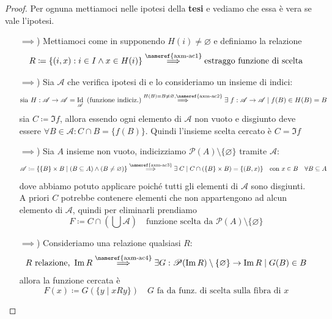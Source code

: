 \documentclass[a4paper,10pt]{article}
\theoremstyle{definition}
\DeclareMathOperator*{\Id}{Id}
\theoremstyle{indentdefinition}
\theoremstyle{indentpostulate}
\theoremstyle{indenttheorem}
\theoremstyle{myremark}
\theoremstyle{indentgeneral}
\begin{document}
\begin{proof} Per ognuna mettiamoci nelle ipotesi della \textbf{tesi} e vediamo che essa è vera se vale l'ipotesi.
    \begin{itemize}
        \item[\nameref{axm-ac1}$\implies$\nameref{axm-ac2})] Mettiamoci come in  supponendo $H(i)\ne\varnothing$ e definiamo la relazione
        $$R\coloneqq\{(i,x):i\in I\land x\in H(i)\}\overset{\text{\nameref{axm-ac1}}}{\implies}\text{estraggo funzione di scelta}$$
        
        \item[\nameref{axm-ac2}$\implies$\nameref{axm-ac3})] Sia $\mathscr{A}$ che verifica ipotesi di  e lo consideriamo un insieme di indici:
        $$\text{sia } H:\mathscr{A}\to \mathscr{A}=\Id_\mathscr{A} \text{ (funzione indiciz.)}\overset{H(B)=B\ne\varnothing,\text{\nameref{axm-ac2}}}{\implies}\exists \; f:\mathscr{A}\to \mathscr{A}\mid f(B)\in H(B)=B$$
        sia $C\coloneqq\Im f$, allora essendo ogni elemento di $\mathscr{A}$ non vuoto e disgiunto deve essere $\forall B\in\mathscr{A}: C\cap B=\{f(B)\}$. Quindi l'insieme scelta cercato è $C=\Im f$
        
        \item[\nameref{axm-ac3}$\implies$\nameref{axm-ac4})] Sia $A$ insieme non vuoto, indicizziamo $\mathscr{P}(A)\setminus\{\varnothing\}$ tramite $\mathscr{A}$:
        $$\mathscr{A}\coloneqq\{\{B\}\times B\mid (B\subseteq A)\land (B\ne\varnothing)\} \overset{\text{\nameref{axm-ac3}}}{\implies} \exists\; C\mid C\cap (\{B\}\times B)=\{(B,x)\}\quad\text{con }x\in B\quad \forall B\subseteq A$$
        dove abbiamo potuto applicare  poiché tutti gli elementi di $\mathscr{A}$ sono disgiunti. A priori $C$ potrebbe contenere elementi che non appartengono ad alcun elemento di $\mathscr{A}$, quindi per eliminarli prendiamo
        $$F\coloneqq C\cap\left(\bigcup\mathscr{A}\right)\quad\text{funzione scelta da $\mathscr{P}(A)\setminus\{\varnothing\}$}$$
        
        \item[\nameref{axm-ac4}$\implies$\nameref{axm-ac1})] Consideriamo una relazione qualsiasi $R$:
        $$ R\text{ relazione, }\Im R\overset{\text{\nameref{axm-ac4}}}{\implies} \exists G:\mathscr{P}(\Im R)\setminus\{\varnothing\}\to \Im R\mid G(B)\in B$$
        allora la funzione cercata è 
        $$F(x)\coloneqq G(\{y\mid xRy\}) \quad G\text{ fa da funz. di scelta sulla fibra di }x$$
    \end{itemize}
\end{proof}
\end{document}
